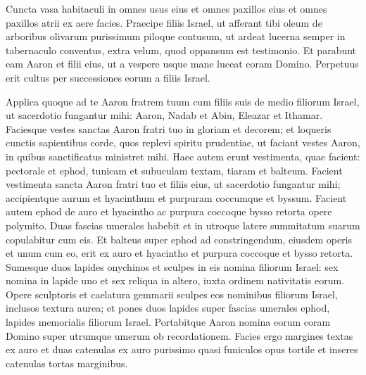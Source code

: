 \begin{biblechapter}
\begin{biblechapter}
\begin{biblechapter}
\begin{biblechapter}
\begin{biblechapter}
\begin{biblechapter}
\begin{biblechapter}
\begin{biblechapter}
\begin{biblechapter}
\begin{biblechapter}
\begin{biblechapter}
\begin{biblechapter}
\begin{biblechapter}
\begin{biblechapter}
\begin{biblechapter}
\begin{biblechapter}
\begin{biblechapter}
\begin{biblechapter}
\begin{biblechapter}
\begin{biblechapter}
\begin{biblechapter}
\begin{biblechapter}
\begin{biblechapter}
\begin{biblechapter}
\begin{biblechapter}
\begin{biblechapter}
\begin{biblechapter}
\verse Cuncta vasa habitaculi in omnes usus eius et omnes paxillos eius et omnes paxillos atrii ex aere facies.
 \verse Praecipe filiis Israel, ut afferant tibi oleum de arboribus olivarum purissimum piloque contusum, ut ardeat lucerna semper 
\verse in tabernaculo conventus, extra velum, quod oppansum est testimonio. Et parabunt eam Aaron et filii eius, ut a vespere usque mane luceat coram Domino. Perpetuus erit cultus per successiones eorum a filiis Israel.
 
\begin{biblechapter}
\verse Applica quoque ad te Aaron fratrem tuum cum filiis suis de medio filiorum Israel, ut sacerdotio fungantur mihi: Aaron, Nadab et Abiu, Eleazar et Ithamar.
 \verse Faciesque vestes sanctas Aaron fratri tuo in gloriam et decorem; 
\verse et loqueris cunctis sapientibus corde, quos replevi spiritu prudentiae, ut faciant vestes Aaron, in quibus sanctificatus ministret mihi. 
\verse Haec autem erunt vestimenta, quae facient: pectorale et ephod, tunicam et subuculam textam, tiaram et balteum. Facient vestimenta sancta Aaron fratri tuo et filiis eius, ut sacerdotio fungantur mihi; 
\verse accipientque aurum et hyacinthum et purpuram coccumque et byssum.
 \verse Facient autem ephod de auro et hyacintho ac purpura coccoque bysso retorta opere polymito. 
\verse Duas fascias umerales habebit et in utroque latere summitatum suarum copulabitur cum eis. 
\verse Et balteus super ephod ad constringendum, eiusdem operis et unum cum eo, erit ex auro et hyacintho et purpura coccoque et bysso retorta. 
\verse Sumesque duos lapides onychinos et sculpes in eis nomina filiorum Israel: 
\verse sex nomina in lapide uno et sex reliqua in altero, iuxta ordinem nativitatis eorum. 
\verse Opere sculptoris et caelatura gemmarii sculpes eos nominibus filiorum Israel, inclusos textura aurea; 
\verse et pones duos lapides super fascias umerales ephod, lapides memorialis filiorum Israel. Portabitque Aaron nomina eorum coram Domino super utrumque umerum ob recordationem. 
\verse Facies ergo margines textas ex auro 
 \verse et duas catenulas ex auro purissimo quasi funiculos opus tortile et inseres catenulas tortas marginibus.

\end{biblechapter}
\end{biblechapter}
\end{biblechapter}
\end{biblechapter}
\end{biblechapter}
\end{biblechapter}
\end{biblechapter}
\end{biblechapter}
\end{biblechapter}
\end{biblechapter}
\end{biblechapter}
\end{biblechapter}
\end{biblechapter}
\end{biblechapter}
\end{biblechapter}
\end{biblechapter}
\end{biblechapter}
\end{biblechapter}
\end{biblechapter}
\end{biblechapter}
\end{biblechapter}
\end{biblechapter}
\end{biblechapter}
\end{biblechapter}
\end{biblechapter}
\end{biblechapter}
\end{biblechapter}
\end{biblechapter}
